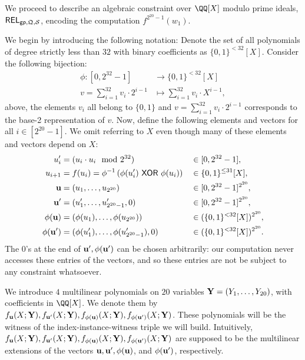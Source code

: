 \documentclass[11pt,letterpaper,usenames,dvipsnames]{article}
\begin{document}
We proceed to describe an algebraic  constraint over $\QQ[X]$ modulo prime ideals, $\mathsf{REL}_{\mathsf{gp}, \mathfrak{Q},\mathcal{S}}$, encoding the computation $f^{2^{20}-1}(w_1)$.

We begin by introducing the following notation: Denote the set of all polynomials of degree strictly less than $32$ with binary coefficients as $\{0,1\}^{< 32}[X]$. Consider the following bijection:
%
\begin{align*}
\phi: [0,2^{32}-1] &\to \{0,1\}^{< 32}[X]\\
v= \sum_{i=1}^{32} v_i\cdot 2^{i-1} &\mapsto \sum_{i=1}^{32} v_i \cdot X^{i-1},
\end{align*}
%
above, the elements $v_i$ all belong to $\{0,1\}$ and $v= \sum_{i=1}^{32} v_i\cdot 2^{i-1}$ corresponds to the base-2 representation of $v$.  Now, define the following elements and vectors  for all $i\in [ 2^{20}-1]$. We omit referring to $X$ even though many of these elements and vectors depend on $X$:
\begin{align*}
    u_i' &= (u_i \cdot u_i \mod 2^{32}) &&\in  [0, 2^{32}-1],\\
    u_{i+1} &=  f(u_i)=\phi^{-1}\left(\phi(u_i') \xor \phi(u_i)\right) &&\in \{0,1\}^{\leq 31}[X],\\
     \uu&=(u_1,\ldots, u_{2^{20}}) &&\in [0,2^{32}-1]^{2^{20}},\\
     \uu' &= (u_1',\ldots, u_{2^{20}-1}', 0) &&\in [0,2^{32}-1]^{2^{20}},\\
          \phi(\uu) &= (\phi(u_1),\ldots, \phi(u_{2^{20}}))&& \in (\{0,1\}^{< 32}[X])^{2^{20}},\\
     \phi(\uu') &= (\phi(u_1'),\ldots, \phi(u_{2^{20}-1}'),0) &&\in (\{0,1\}^{< 32}[X])^{2^{20}}.%
\end{align*}
The $0$'s at the end of $\mathbf{u}', \phi(\mathbf{u}')$ can be chosen arbitrarily: our computation never accesses these entries of the vectors, and so these entries are not be subject to any constraint whatsoever.


We introduce $4$ multilinear polynomials on $20$ variables $\mathbf{Y}=(Y_1,\ldots, Y_{20})$, with coefficients in $\QQ[X]$. We denote them by $f_{\mathbf{u}}(X; \mathbf{Y}), f_{\mathbf{u}'}(X;\mathbf{Y}), f_{\phi(\mathbf{u})}(X;\mathbf{Y}), f_{\phi(\mathbf{u}')}(X;\mathbf{Y})$. These polynomials will be the witness of the index-instance-witness triple we will build. Intuitively, $f_{\mathbf{u}}(X; \mathbf{Y}), f_{\mathbf{u}'}(X;\mathbf{Y}), f_{\phi(\mathbf{u})}(X;\mathbf{Y}), f_{\phi(\mathbf{u}')}(X;\mathbf{Y})$ are supposed to be the multilinear extensions of the vectors $\mathbf{u}, \mathbf{u}', \phi(\mathbf{u})$, and $\phi(\mathbf{u}')$, respectively. 
\end{document}
